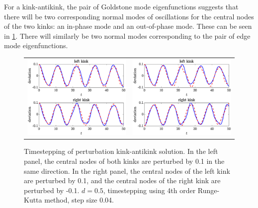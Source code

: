 \documentclass[12pt,reqno]{amsart}
\begin{document}

For a kink-antikink, the pair of Goldstone mode eigenfunctions suggests that there will be two corresponding normal modes of oscillations for the central nodes of the two kinks: an in-phase mode and an out-of-phase mode. These can be seen in \cref{fig:kaktimestep}. There will similarly be two normal modes corresponding to the pair of edge mode eigenfunctions.

\begin{figure}[H]
	\begin{center}
	\begin{tabular}{cc}
	\includegraphics[width=6cm]{kakoscG1.eps} &
	\includegraphics[width=6cm]{kakoscG2.eps} 
	\end{tabular}
	\end{center}
	\caption{Timestepping of perturbation kink-antikink solution. In the left panel, the central nodes of both kinks are perturbed by 0.1 in the same direction. In the right panel, the central nodes of the left kink are perturbed by 0.1, and the central nodes of the right kink are perturbed by -0.1. $d = 0.5$, timestepping using 4th order Runge-Kutta method, step size 0.04.} 
	\label{fig:kaktimestep}
\end{figure}
\end{document}
